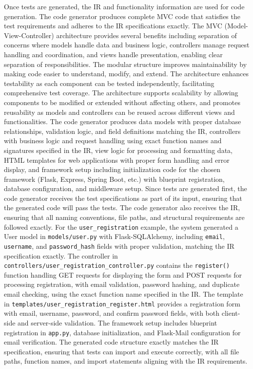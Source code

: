 Once tests are generated, the IR and functionality information are used for code generation. The code generator produces complete MVC code that satisfies the test requirements and adheres to the IR specifications exactly. The MVC (Model-View-Controller) architecture provides several benefits including separation of concerns where models handle data and business logic, controllers manage request handling and coordination, and views handle presentation, enabling clear separation of responsibilities. The modular structure improves maintainability by making code easier to understand, modify, and extend. The architecture enhances testability as each component can be tested independently, facilitating comprehensive test coverage. The architecture supports scalability by allowing components to be modified or extended without affecting others, and promotes reusability as models and controllers can be reused across different views and functionalities. The code generator produces data models with proper database relationships, validation logic, and field definitions matching the IR, controllers with business logic and request handling using exact function names and signatures specified in the IR, view logic for processing and formatting data, HTML templates for web applications with proper form handling and error display, and framework setup including initialization code for the chosen framework (Flask, Express, Spring Boot, etc.) with blueprint registration, database configuration, and middleware setup. Since tests are generated first, the code generator receives the test specifications as part of its input, ensuring that the generated code will pass the tests. The code generator also receives the IR, ensuring that all naming conventions, file paths, and structural requirements are followed exactly. For the \texttt{user\_registration} example, the system generated a User model in \texttt{models/user.py} with Flask-SQLAlchemy, including \texttt{email}, \texttt{username}, and \texttt{password\_hash} fields with proper validation, matching the IR specification exactly. The controller in \texttt{controllers/user\_registration\_controller.py} contains the \texttt{register()} function handling GET requests for displaying the form and POST requests for processing registration, with email validation, password hashing, and duplicate email checking, using the exact function name specified in the IR. The template in \texttt{templates/user\_registration\_register.html} provides a registration form with email, username, password, and confirm password fields, with both client-side and server-side validation. The framework setup includes blueprint registration in \texttt{app.py}, database initialization, and Flask-Mail configuration for email verification. The generated code structure exactly matches the IR specification, ensuring that tests can import and execute correctly, with all file paths, function names, and import statements aligning with the IR requirements.

